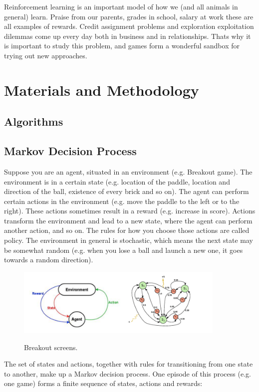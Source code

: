 \documentclass[a4paper,11pt]{article}
\begin{document}
				Reinforcement learning is an important model of how we (and all animals in general) learn. Praise from our parents, grades in school, salary at work these are all examples of rewards. Credit assignment problems and exploration exploitation dilemmas come up every day both in business and in relationships. Thats why it is important to study this problem, and games form a wonderful sandbox for trying out new approaches.

	\section{Materials and Methodology}
		\subsection{Algorithms}
			\subsection{Markov Decision Process}
				Suppose you are an agent, situated in an environment (e.g. Breakout game). The environment is in a certain state (e.g. location of the paddle, location and direction of the ball, existence of every brick and so on). The agent can perform certain actions in the environment (e.g. move the paddle to the left or to the right). These actions sometimes result in a reward (e.g. increase in score). Actions transform the environment and lead to a new state, where the agent can perform another action, and so on. The rules for how you choose those actions are called policy. The environment in general is stochastic, which means the next state may be somewhat random (e.g. when you lose a ball and launch a new one, it goes towards a random direction).
				\begin{figure}[!ht]
					\begin{centering}
						\includegraphics[width=10cm]{../Design/images/mdp.png}\\
						\caption{Breakout screens.}
					\end{centering}
				\end{figure}
				The set of states and actions, together with rules for transitioning from one state to another, make up a Markov decision process. One episode of this process (e.g. one game) forms a finite sequence of states, actions and rewards:
\end{document}
